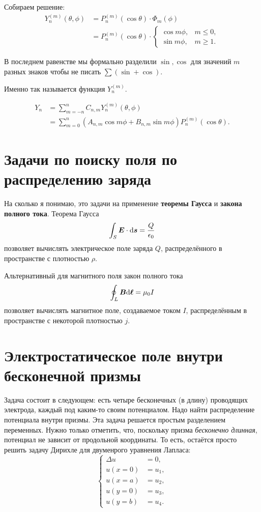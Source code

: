 \documentclass[12pt]{report}
\begin{document}
Собираем решение:
\begin{align*}
Y_n^{(m)}(\theta, \phi) &= P_n^{(m)} (\cos\theta) \cdot \Phi_m(\phi) \\
	&= P_n^{(m)}(\cos\theta)\cdot 
	\begin{cases}
	\cos m\phi, & m \le 0, \\
	\sin m\phi, & m \ge 1.
	\end{cases}
\end{align*}
\begin{rmk}
	В последнем равенстве мы формально разделили $\sin, \cos$ для значений $m$ разных знаков чтобы не писать $\sum(\sin + \cos)$.
\end{rmk}
\begin{rmk}
	Именно так называется функция $Y_n^{(m)}$.
\end{rmk}
\begin{rmk}
	\begin{align*}
	Y_n &= \sum_{m=-n}^n C_{n,m}Y_n^{(m)}(\theta, \phi) \\
	&= \sum_{m=0}^n\left(A_{n,m}\cos m\phi + B_{n,m}\sin m\phi\right) P_n^{(m)}(\cos\theta).
	\end{align*}
\end{rmk}

\section{Задачи по поиску поля по распределению заряда}
На сколько я понимаю, это задачи на применение \textbf{теоремы Гаусса} и \textbf{закона полного тока}. 
Теорема Гаусса
\[
\int_S \boldsymbol{E}\cdot \mathrm d\boldsymbol{s} = \frac{Q}{\epsilon_0}
\]
позволяет вычислять электрическое поле заряда  $Q$, распределённого в пространстве с плотностью $\rho$.

Альтернативный для магнитного поля закон полного тока
\[
\oint_L\boldsymbol{B}\mathrm d\boldsymbol{\ell} = \mu_0 I
\]
позволяет вычислять магнитное поле, создаваемое током $I$, распределённым в пространстве с некоторой плотностью $j$.

\section{Электростатическое поле внутри бесконечной призмы}
Задача состоит в следующем: есть четыре бесконечных (в длину) проводящих электрода, каждый под каким-то своим потенциалом. Надо найти распределение потенциала внутри призмы.
Эта задача решается простым разделением переменных. Нужно только отметить, что, поскольку призма \textit{бесконечно длинная}, потенциал не зависит от продольной координаты. То есть, остаётся просто решить задачу Дирихле для двуменрого уравнения Лапласа:
\begin{equation*}
	\begin{cases}
		\Delta u &= 0, \\
		u(x=0) &= u_1, \\
		u(x=a) &= u_2, \\
		u(y=0) &= u_3, \\
		u(y=b) &= u_4.
	\end{cases}
\end{equation*}
\end{document}
